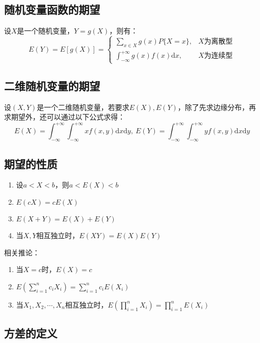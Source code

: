 \documentclass[a4paper,12pt]{ctexart}
\begin{document}
\subsection{随机变量函数的期望}

设$X$是一个随机变量，$Y = g(X)$，则有：
\begin{equation*}
	E(Y) = E[g(X)] = \begin{cases}
		\sum_{x\in X}g(x)P\{X = x\}, & X\text{为离散型} \\
		\int_{-\infty}^{+\infty}g(x)f(x)\mathrm{d}x, & X\text{为连续型}
	\end{cases}
\end{equation*}

\subsection{二维随机变量的期望}

设$(X,Y)$是一个二维随机变量，若要求$E(X),E(Y)$，除了先求边缘分布，再求期望外，还可以通过以下公式求得：
\begin{equation*}
	E(X) = \int_{-\infty}^{+\infty}\int_{-\infty}^{+\infty}xf(x,y)\mathrm{d}x\mathrm{d}y,\ E(Y) = \int_{-\infty}^{+\infty}\int_{-\infty}^{+\infty}yf(x,y)\mathrm{d}x\mathrm{d}y
\end{equation*}

\subsection{期望的性质}

\begin{enumerate}
	\item 设$a < X < b$，则$a < E(X) < b$
	\item $E(cX) = cE(X)$
	\item $E(X+Y) = E(X) + E(Y)$
	\item 当$X,Y$相互独立时，$E(XY) = E(X)E(Y)$
\end{enumerate}

相关推论：
\begin{enumerate}
	\item 当$X = c$时，$E(X) = c$
	\item $E\left(\sum_{i=1}^nc_iX_i\right) = \sum_{i=1}^nc_iE(X_i)$
	\item 当$X_1,X_2,\cdots,X_n$相互独立时，$E\left(\prod_{i=1}^nX_i\right) = \prod_{i=1}^nE(X_i)$
\end{enumerate}

\subsection{方差的定义}
\end{document}
